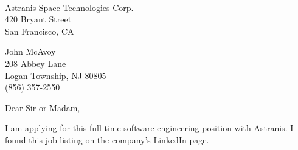 \documentclass[11pt]{letter} %
\begin{document}

\begin{letter}{\\
Astranis Space Technologies Corp.\\
420 Bryant Street\\
San Francisco, CA}


\begin{center}
John McAvoy \\ %
208 Abbey Lane \\ Logan Township, NJ 80805 \\ (856) 357-2550 %
\end{center}
\vfill

\signature{John McAvoy} %


\opening{Dear Sir or Madam,}
\newcommand{\company}{Astranis}


I am applying for this full-time software engineering position with Astranis. I
found this job listing on the company's LinkedIn page.\par


\end{letter}
\end{document}

